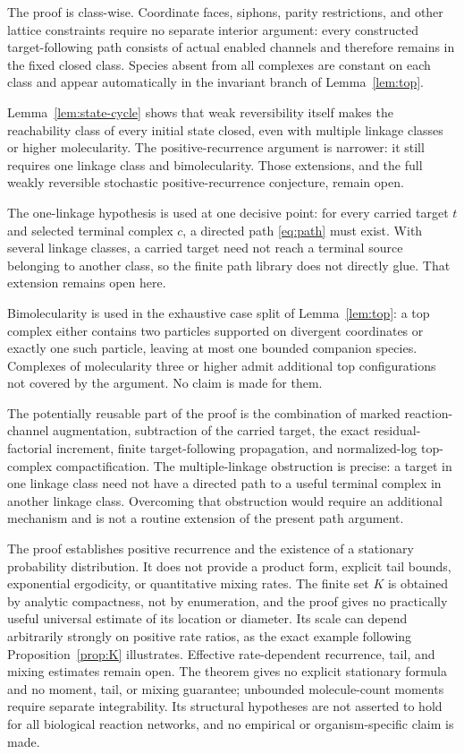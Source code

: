 The proof is class-wise.  Coordinate faces, siphons, parity restrictions, and
other lattice constraints require no separate interior argument: every
constructed target-following path consists of actual enabled channels and
therefore remains in the fixed closed class.  Species absent from all
complexes are constant on each class and appear automatically in the
invariant branch of Lemma~\ref{lem:top}.

Lemma~\ref{lem:state-cycle} shows that weak reversibility itself makes the
reachability class of every initial state closed, even with multiple linkage
classes or higher molecularity.  The positive-recurrence argument is narrower:
it still requires one linkage class and bimolecularity.  Those extensions, and
the full weakly reversible stochastic positive-recurrence conjecture, remain
open.

The one-linkage hypothesis is used at one decisive point: for every carried
target \(t\) and selected terminal complex \(c\), a directed path
\eqref{eq:path} must exist.  With several linkage classes, a carried target
need not reach a terminal source belonging to another class, so the finite
path library does not directly glue.  That extension remains open here.

Bimolecularity is used in the exhaustive case split of
Lemma~\ref{lem:top}: a top complex either contains two particles supported on
divergent coordinates or exactly one such particle, leaving at most one
bounded companion species.  Complexes of molecularity three or higher admit
additional top configurations not covered by the argument.  No claim is made
for them.

The potentially reusable part of the proof is the combination of marked
reaction-channel augmentation, subtraction of the carried target, the exact
residual-factorial increment, finite target-following propagation, and
normalized-log top-complex compactification.  The multiple-linkage obstruction
is precise: a target in one linkage class need not have a directed path to a
useful terminal complex in another linkage class.  Overcoming that obstruction
would require an additional mechanism and is not a routine extension of the
present path argument.

The proof establishes positive recurrence and the existence of a stationary
probability distribution.  It does not provide a product form, explicit tail
bounds, exponential ergodicity, or quantitative mixing rates.  The finite set
\(K\) is obtained by analytic compactness, not by enumeration, and the proof
gives no practically useful universal estimate of its location or diameter.
Its scale can depend arbitrarily strongly on positive rate ratios, as the
exact example following Proposition~\ref{prop:K} illustrates.  Effective
rate-dependent recurrence, tail, and mixing estimates remain open.
The theorem gives no explicit stationary formula and no moment, tail, or
mixing guarantee; unbounded molecule-count moments require separate
integrability.  Its structural hypotheses are not asserted to hold for all
biological reaction networks, and no empirical or organism-specific claim is
made.


